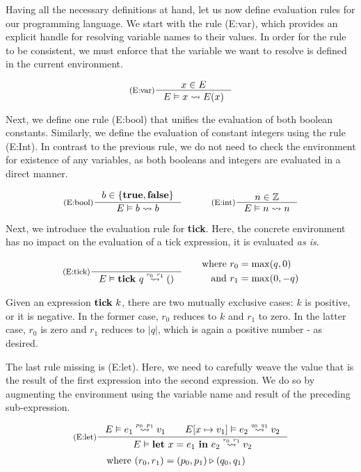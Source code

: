 Having all the necessary definitions at hand, let us now define evaluation rules for our programming language. We start with the rule (E:var), which provides an explicit handle for resolving variable names to their values. In order for the rule to be consistent, we must enforce that the variable we want to resolve is defined in the current environment. 

\[
   \inference[(E:var)]
   {\contains{E}{x}}
   {\evals{E}{x}{E(x)}{}{}}
\]

Next, we define one rule (E:bool) that unifies the evaluation of both boolean constants. Similarly, we define the evaluation of constant integers using the rule (E:Int). In contrast to the previous rule, we do not need to check the environment for existence of any variables, as both booleans and integers are evaluated in a direct manner.

\[
   \inference[(E:bool)]{b \in \{\true, \false\}}{\evals{E}{b}{b}{}{}}%
   \quad\quad\quad
   \inference[(E:int)]{n \in \mathbb{Z}}{\evals{E}{n}{n}{}{}}
\]

Next, we introduce the evaluation rule for \textbf{tick}. Here, the concrete environment has no impact on the evaluation of a tick expression, it is evaluated \emph{as is}. 

\[
   \inference[(E:tick)]
   {}
   {\evals{E}{\tick{q}}{()}{r_0}{r_1}}%
   \qquad 
   \begin{aligned}
      \text{where }  &r_0 = \max(q, 0)\\
      \text{and }    &r_1 = \max(0, -q) 
   \end{aligned}
\]

Given an expression \(\mathbf{tick}~k\), there are two mutually exclusive cases: \(k\) is positive, or it is negative. In the former case, \(r_0\) reduces to \(k\) and \(r_1\) to zero. In the latter case, \(r_0\) is zero and \(r_1\) reduces to \(|q|\), which is again a positive number - as desired. 

The last rule missing is (E:let). Here, we need to carefully weave the value that is the result of the first expression into the second expression. We do so by augmenting the environment using the variable name and result of the preceding sub-expression.

\[
   \inference[(E:let)]
   {\evals{E}{e_1}{v_1}{p_0}{p_1} \qquad \evals{\envaugment{E}{x}{v_1}}{e_2}{v_2}{q_0}{q_1}}
   {\evals{E}{\letexp{x}{e_1}{e_2}}{v_2}{r_0}{r_1}}%
\]
\begin{align*}
   \text{where }  &(r_0, r_1) = (p_0, p_1) \triangleright (q_0, q_1)
\end{align*}


